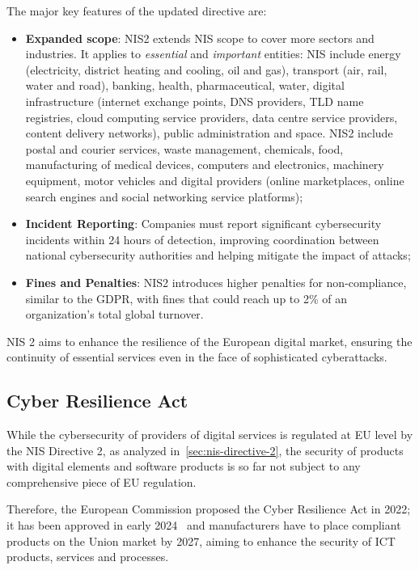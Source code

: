 The major key features of the updated directive are:~\cite{nis2-directive-faqs}
\begin{itemize}
  \item \textbf{Expanded scope}: NIS2 extends NIS scope to cover more sectors and industries. It applies to \textit{essential} and \textit{important} entities: NIS include energy (electricity, district heating and cooling, oil and gas), transport (air, rail, water and road), banking, health, pharmaceutical, water, digital infrastructure (internet exchange points, DNS providers, TLD name registries, cloud computing service providers, data centre service providers, content delivery networks), public administration and space. NIS2 include postal and courier services, waste management, chemicals, food, manufacturing of medical devices, computers and electronics, machinery equipment, motor vehicles and digital providers (online marketplaces, online search engines and social networking service platforms);
  \item \textbf{Incident Reporting}: Companies must report significant cybersecurity incidents within 24 hours of detection, improving coordination between national cybersecurity authorities and helping mitigate the impact of attacks;
  \item \textbf{Fines and Penalties}: NIS2 introduces higher penalties for non-compliance, similar to the GDPR, with fines that could reach up to 2\% of an organization's total global turnover.
\end{itemize}

NIS 2 aims to enhance the resilience of the European digital market, ensuring the continuity of essential services even in the face of sophisticated cyberattacks.

\subsection{Cyber Resilience Act}

While the cybersecurity of providers of digital services is regulated at EU level by the NIS Directive 2, as analyzed in~\cref{sec:nis-directive-2}, the security of products with digital elements and software products is so far not subject to any comprehensive piece of EU regulation.~\cite{cra-eu}

Therefore, the European Commission proposed the Cyber Resilience Act in 2022; it has been approved in early 2024~\cite{cra-timelinel} and manufacturers have to place compliant products on the Union market by 2027, aiming to enhance the security of ICT products, services and processes.


